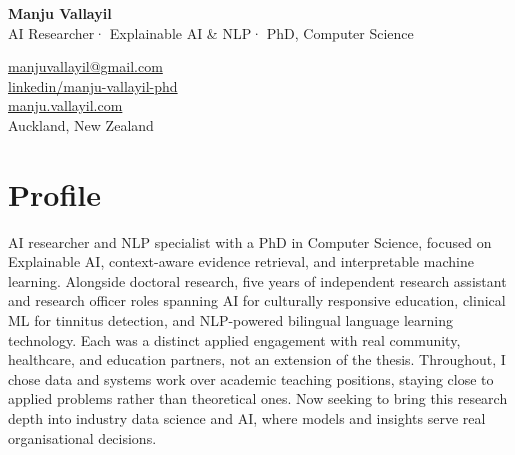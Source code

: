 \documentclass[10.5pt,a4paper]{article}
\begin{document}
\vspace*{-1.5cm}
\begin{tcolorbox}[
  enhanced, colback=accent, colframe=accent,
  arc=0pt, boxrule=0pt,
  left=1.8cm, right=1.8cm, top=16pt, bottom=14pt,
  enlarge left by=-1.8cm, enlarge right by=-1.8cm,
  width=\textwidth+3.6cm
]
  \begin{minipage}[t]{0.54\linewidth}
    {\color{white}\LARGE\bfseries Manju Vallayil}\\[5pt]
    {\color{white!65!accent}\small
      AI Researcher\enspace·\enspace
      Explainable AI \& NLP\enspace·\enspace
      PhD, Computer Science}
  \end{minipage}%
  \hfill
  \begin{minipage}[t]{0.43\linewidth}
    \raggedleft\small\color{white!80!accent}
    \faEnvelope\enspace
      \href{mailto:manjuvallayil@gmail.com}{\textcolor{white!80!accent}{manjuvallayil@gmail.com}}\\[3pt]
    \faLinkedin\enspace
      \href{https://linkedin.com/in/manju-vallayil-phd-5b1b7a142/}{\textcolor{white!80!accent}{linkedin/manju-vallayil-phd}}\\[3pt]
    \faGlobe\enspace
      \href{https://manju.vallayil.com}{\textcolor{white!80!accent}{manju.vallayil.com}}\\[3pt]
    \faMapMarker*\enspace Auckland, New Zealand
  \end{minipage}
\end{tcolorbox}

\vspace{12pt}

\section{Profile}

AI researcher and NLP specialist with a PhD in Computer Science, focused on Explainable AI,
context-aware evidence retrieval, and interpretable machine learning. Alongside doctoral
research, five years of independent research assistant and research officer roles
spanning AI for culturally responsive education, clinical ML for tinnitus detection, and
NLP-powered bilingual language learning technology. Each was a distinct applied engagement
with real community, healthcare, and education partners, not an extension of the thesis.
Throughout, I chose data and systems work over academic teaching positions, staying close to
applied problems rather than theoretical ones. Now seeking to bring this research depth into
industry data science and AI, where models and insights serve real organisational decisions.
\end{document}
